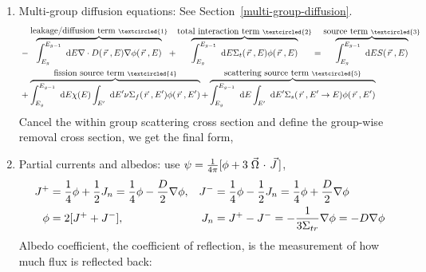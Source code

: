 \documentclass{school-22.211-notes}
\begin{document}
\clearpage
{} 
\begin{enumerate}
\item Multi-group diffusion equations: See Section~\ref{multi-group-diffusion}. 
\begin{align}
& - \overbrace{\int_{E_g}^{E_{g-1}} \dE \divergence D(\vecr, E) \gradient \phi(\vecr, E)}^{\mbox{leakage/diffusion term }\textcircled{1}} + 
\overbrace{\int_{E_g}^{E_{g-1}} \dE \Sigma_t(\vecr, E) \phi(\vecr, E)}^{\mbox{total interaction term }\textcircled{2}} = \overbrace{\int_{E_g}^{E_{g-1}} \dE S(\vecr, E)}^{\mbox{source term } \textcircled{3}}  \\
& + \overbrace{\int_{E_g}^{E_{g-1}} \dE \chi(E) \int_{E'} \dE' \nu \Sigma_f (\vecr, E') \phi(\vecr, E')}^{\mbox{fission source term }\textcircled{4}} 
 + \overbrace{\int_{E_g}^{E_{g-1}} \dE \int_{E'} \dE' \Sigma_s(\vecr, E'\to E) \phi(\vecr, E')}^{\mbox{scattering source term }\textcircled{5}} 
\end{align}
Cancel the within group scattering cross section and define the group-wise removal cross section, we get the final form,

\item Partial currents and albedos: use $\psi = \frac{1}{4\pi} [\phi + 3 \left.\vec{\Omega}\right. \cdot \left.\vec{J}\right.]$, 
  \begin{align}
    J^+ &= \frac{1}{4} \phi + \frac{1}{2} J_n = \frac{1}{4} \phi - \frac{D}{2} \nabla \phi, & J^- &= \frac{1}{4} \phi - \frac{1}{2} J_n = \frac{1}{4} \phi + \frac{D}{2} \nabla \phi \\
    \phi &= 2[J^+ + J^-], & J_n &= J^+ - J^- =  -\frac{1}{3 \Sigma_{tr}} \nabla \phi  = - D \nabla \phi
  \end{align}
  Albedo coefficient, the coefficient of reflection, is the measurement of how much flux is reflected back: 
  


\end{enumerate}
\end{document}
